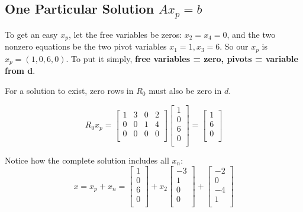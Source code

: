 \subsection{One Particular Solution \(Ax_p = b\) }

To get an easy \(x_p\), let the free variables be zeros: \(x_2 = x_4 = 0\), and the two nonzero equations be the two pivot variables \(x_1 = 1, x_3 = 6\). So our \(x_p\) is \(x_p = (1, 0, 6, 0)\). To put it simply, \textbf{free variables = zero, pivots = variable from d}. 

For a solution to exist, zero rows in \(R_0\) must also be zero in \(d\). 

\[
    R_{0}x_p = 
    \begin{bmatrix}
        1 & 3 & 0 & 2  \\
        0 & 0 & 1 & 4  \\
        0 & 0 & 0 & 0  \\
    \end{bmatrix} 
    \begin{bmatrix}
         1 \\
         0 \\
          6\\
          0\\
    \end{bmatrix}
    = 
    \begin{bmatrix}
         1 \\
          6\\
          0\\
    \end{bmatrix}
\]

Notice how the complete solution includes all \(x_n\):
\[
    x = x_p + x_n = 
    \begin{bmatrix}
         1 \\
         0 \\
         6 \\
         0 \\
    \end{bmatrix}
    + x_2
    \begin{bmatrix}
         -3 \\
         1 \\
         0 \\
         0 \\
    \end{bmatrix}
    +
    \begin{bmatrix}
        -2  \\
        0  \\
        -4  \\
        1  \\
    \end{bmatrix}
\] 

